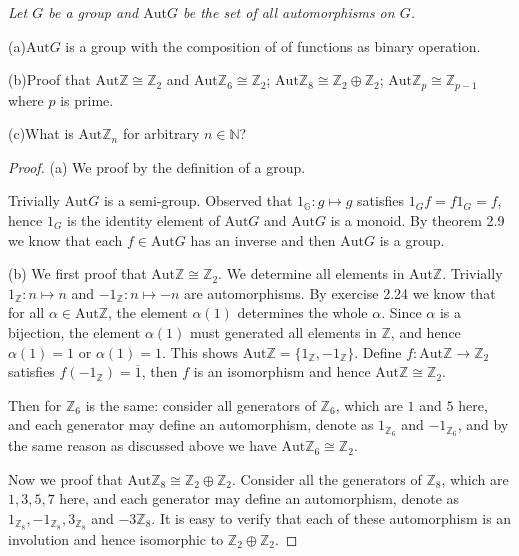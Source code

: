 \begin{problem}\em
Let $G$ be a group and $\mathrm{Aut}G$ be the set of all automorphisms on $G$.\par
(a)$\mathrm{Aut}G$ is a group with the composition of of functions as binary operation.\par
(b)Proof that $\mathrm{Aut}\mathbb{Z}\cong\mathbb{Z}_2$ and $\mathrm{Aut}\mathbb{Z}_6\cong\mathbb{Z}_2$; $\mathrm{Aut}\mathbb{Z}_8\cong\mathbb{Z}_2\oplus\mathbb{Z}_2$; $\mathrm{Aut}\mathbb{Z}_p\cong\mathbb{Z}_{p-1}$ where $p$ is prime.\par
(c)What is $\mathrm{Aut}\mathbb{Z}_n$ for arbitrary $n\in\mathbb{N}$?
\end{problem}
\begin{proof}
(a) We proof by the definition of a group.\par
Trivially $\mathrm{Aut}G$ is a semi-group. Observed that $1_\mathbb{G}:g\mapsto g$ satisfies $1_Gf=f1_G=f$, hence $1_G$ is the identity element of $\mathrm{Aut}G$ and $\mathrm{Aut}G$ is a monoid. By theorem 2.9 we know that each $f\in\mathrm{Aut}G$ has an inverse and then $\mathrm{Aut}G$ is a group.\par
(b) We first proof that $\mathrm{Aut}\mathbb{Z}\cong\mathbb{Z}_2$. We determine all elements in $\mathrm{Aut}\mathbb{Z}$. Trivially $1_\mathbb{Z}:n\mapsto n$ and $-1_\mathbb{Z}:n\mapsto -n$ are automorphisms. By exercise 2.24 we know that for all $\alpha\in\mathrm{Aut}\mathbb{Z}$, the element $\alpha(1)$ determines the whole $\alpha$. Since $\alpha$ is a bijection, the element $\alpha(1)$ must generated all elements in $\mathbb{Z}$, and hence $\alpha(1)=1$ or $\alpha(1)=1$. This shows $\mathrm{Aut}\mathbb{Z}=\{1_\mathbb{Z},-1_\mathbb{Z}\}$. Define $f:\mathrm{Aut}\mathbb{Z}\to\mathbb{Z}_2$ satisfies $f(-1_\mathbb{Z})=\overline{1}$, then $f$ is an isomorphism and hence $\mathrm{Aut}\mathbb{Z}\cong\mathbb{Z}_2$.\par
Then for $\mathbb{Z}_6$ is the same: consider all generators of $\mathbb{Z}_6$, which are $1$ and $5$ here, and each generator may define an automorphism, denote as $1_{\mathbb{Z}_6}$ and $-1_{\mathbb{Z}_6}$, and by the same reason as discussed above we have $\mathrm{Aut}\mathbb{Z}_6\cong\mathbb{Z}_2$.\par
Now we proof that $\mathrm{Aut}\mathbb{Z}_8\cong\mathbb{Z}_2\oplus\mathbb{Z}_2$. Consider all the generators of $\mathbb{Z}_8$, which are $1,3,5,7$ here, and each generator may define an automorphism, denote as $1_{\mathbb{Z}_8},-1_{\mathbb{Z}_8},3_{\mathbb{Z}_8}$ and $-3{\mathbb{Z}_8}$. It is easy to verify that each of these automorphism is an involution and hence isomorphic to $\mathbb{Z}_2\oplus\mathbb{Z}_2$.\par

\end{proof}
